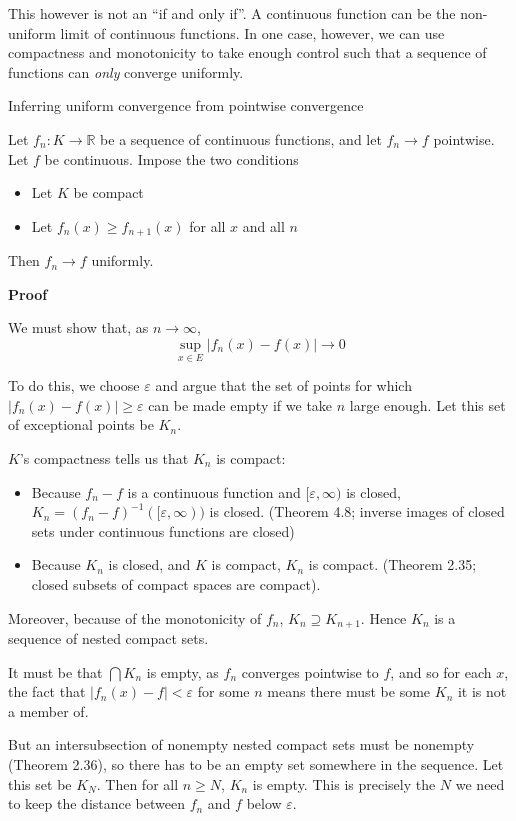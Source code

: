 This however is not an ``if and only if''. A continuous function can be the non-uniform limit of continuous functions. In one case, however, we can use compactness and monotonicity to take enough control such that a sequence of functions can \textit{only} converge uniformly.

\begin{example}Inferring uniform convergence from pointwise convergence
    
    Let $f_n: K \rightarrow \mathbb{R}$ be a sequence of continuous functions, and let $f_n \rightarrow f$ pointwise. Let $f$ be continuous. Impose the two conditions
    \begin{itemize}
        \item Let $K$ be compact
        \item Let $f_n(x) \geq f_{n+1}(x)$ for all $x$ and all $n$
    \end{itemize}
    Then $f_n \rightarrow f$ uniformly.

    \textbf{Proof}

    We must show that, as $n \rightarrow \infty$,
    \[\sup_{x \in E}|f_n(x) - f(x)| \rightarrow 0\]

    To do this, we choose $\varepsilon$ and argue that the set of points for which $|f_n(x) - f(x)| \geq \varepsilon$ can be made empty if we take $n$ large enough. Let this set of exceptional points be $K_n$.


    $K$'s compactness tells us that $K_n$ is compact:
    \begin{itemize}
        \item Because $f_n - f$ is a continuous function and $[\varepsilon, \infty)$ is closed, $K_n = (f_n-f)^{-1}([\varepsilon, \infty))$ is closed. (Theorem 4.8; inverse images of closed sets under continuous functions are closed) 
        \item Because $K_n$ is closed, and $K$ is compact, $K_n$ is compact. (Theorem 2.35; closed subsets of compact spaces are compact).
    \end{itemize}

    Moreover, because of the monotonicity of $f_n$, $K_n \supseteq K_{n+1}$. Hence $K_n$ is a sequence of nested compact sets.

    It must be that $\bigcap K_n$ is empty, as $f_n$ converges pointwise to $f$, and so for each $x$, the fact that $|f_n(x) - f| < \varepsilon$ for some $n$ means there must be some $K_n$ it is not a member of.

    But an intersubsection of nonempty nested compact sets must be nonempty (Theorem 2.36), so there has to be an empty set somewhere in the sequence. Let this set be $K_N$. Then for all $n \geq N$, $K_n$ is empty. This is precisely the $N$ we need to keep the distance between $f_n$ and $f$ below $\varepsilon$.
\end{example}

